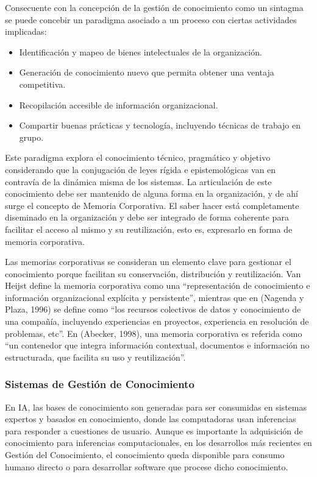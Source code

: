 Consecuente con la concepción de la gestión de conocimiento como un sintagma se puede concebir un paradigma asociado a un proceso con ciertas actividades implicadas: 

\begin{itemize}
\item Identificación y mapeo de bienes intelectuales de la organización.
\item Generación de conocimiento nuevo que permita obtener una ventaja competitiva. 
\item Recopilación accesible de información organizacional. 
\item Compartir buenas prácticas y tecnología, incluyendo técnicas de trabajo en grupo.
\end{itemize}

Este paradigma explora el conocimiento técnico, pragmático y objetivo considerando que la conjugación de leyes rígida e epistemológicas van en contravía de la dinámica misma de los sistemas. La articulación de este conocimiento debe ser mantenido de alguna forma en la organización, y de ahí surge el concepto de Memoria Corporativa. El saber hacer está completamente diseminado en la organización y debe ser integrado de forma coherente para facilitar el acceso al mismo y su reutilización, esto es, expresarlo en forma de memoria corporativa. 

Las memorias corporativas se consideran un elemento clave para gestionar el conocimiento porque facilitan su conservación, distribución y reutilización. Van Heijst define la memoria corporativa como una “representación de conocimiento e información organizacional explícita y persistente”, mientras que en (Nagenda y Plaza, 1996) se define como “los recursos colectivos de datos y conocimiento de una compañía, incluyendo experiencias en proyectos, experiencia en resolución de problemas, etc”. En (Abecker, 1998), una memoria corporativa es referida como “un contenedor que integra información contextual, documentos e información no estructurada, que facilita su uso y reutilización”.

%

\subsubsection{Sistemas de Gestión de Conocimiento}

En IA, las bases de conocimiento son generadas para ser consumidas en sistemas expertos y basados en conocimiento, donde las computadoras usan inferencias para responder a cuestiones de usuario. Aunque es importante la adquisición de conocimiento para inferencias computacionales, en los desarrollos más recientes en Gestión del Conocimiento, el conocimiento queda disponible para consumo humano directo o para desarrollar software que procese dicho conocimiento. 

